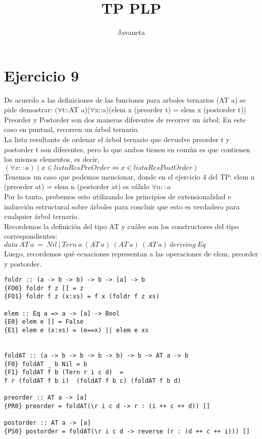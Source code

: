 \documentclass{article}
\title{TP PLP}
\author{Javaneta}
\begin{document}
\newcommand{\streq}[1]{\stackrel{\text{#1}}{=}}

\maketitle

\section{Ejercicio 9}
De acuerdo a las definiciones de las funciones para arboles ternarios (AT a) se pide demostrar: $(\forall$t::AT a)($\forall$x::a)(elem x (preorder t) = elem x (postorder t))  \\

Preorder y Postorder son dos maneras diferentes de recorrer un árbol; En este caso en puntual, recorren un árbol ternario.  \\

La lista resultante de ordenar el árbol ternario que devuelve preorder t y postorder t son diferentes, pero lo que ambos tienen en común es que contienen los mismos elementos, es decir, $(\forall x::a) (x \in listaResPreOrder \iff x \in listaResPostOrder)$ \\
Tenemos un caso que podemos mencionar, donde en el ejercicio 4 del TP: elem n (preorder at) = elem n (postorder at) es válido $\forall n::a$ \\

Por lo tanto, probemos esto utilizando los principios de extensionalidad e inducción estructural sobre árboles para concluir que esto es verdadero para cualquier árbol ternario.  \\

Recordemos la definición del tipo AT y cuáles son los constructores del tipo correspondientes: $ data \ AT \ a \ = \ Nil \ | \ Tern \ a \ (AT \ a) \ (AT \ a) \ (AT \ a) \ deriving \ Eq$ \\

Luego, recordemos qué ecuaciones representan a las operaciones de elem, preorder y postorder. 

\begin{lstlisting}
foldr :: (a -> b -> b) -> b -> [a] -> b
{FO0} foldr f z [] = z
{FO1} foldr f z (x:xs) = f x (foldr f z xs)

elem :: Eq a => a -> [a] -> Bool
{E0} elem e [] = False
{E1} elem e (x:xs) = (e==x) || elem e xs


foldAT :: (a -> b -> b -> b -> b) -> b -> AT a -> b 
{F0} foldAT _ b Nil = b 
{F1} foldAT f b (Tern r i c d)  = 
f r (foldAT f b i)  (foldAT f b c) (foldAT f b d)

preorder :: AT a -> [a]
{PR0} preorder = foldAT(\r i c d -> r : (i ++ c ++ d)) []

postorder :: AT a -> [a]
{PS0} postorder = foldAT(\r i c d -> reverse (r : (d ++ c ++ i))) []
\end{lstlisting}
\end{document}
